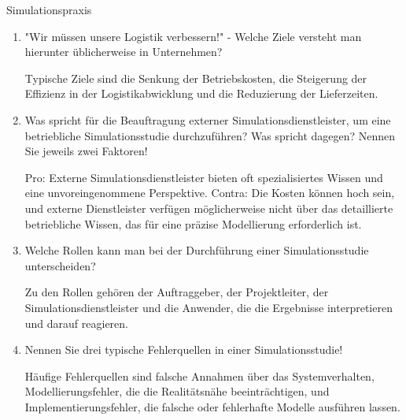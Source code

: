 \documentclass{article}
\begin{document}
\begin{exercise}{Simulationspraxis}
  \begin{enumerate}
    \item "Wir müssen unsere Logistik verbessern!" - Welche Ziele versteht man hierunter üblicherweise in Unternehmen?

          \begin{solution}
            Typische Ziele sind die Senkung der Betriebskosten, die Steigerung der Effizienz in der Logistikabwicklung und die Reduzierung der Lieferzeiten.
          \end{solution}

    \item Was spricht für die Beauftragung externer Simulationsdienstleister, um eine betriebliche Simulationsstudie durchzuführen? Was spricht dagegen? Nennen Sie jeweils zwei Faktoren!

          \begin{solution}
            Pro: Externe Simulationsdienstleister bieten oft spezialisiertes Wissen und eine unvoreingenommene Perspektive. Contra: Die Kosten können hoch sein, und externe Dienstleister verfügen möglicherweise nicht über das detaillierte betriebliche Wissen, das für eine präzise Modellierung erforderlich ist.
          \end{solution}

    \item Welche Rollen kann man bei der Durchführung einer Simulationsstudie unterscheiden?

          \begin{solution}
            Zu den Rollen gehören der Auftraggeber, der Projektleiter, der Simulationsdienstleister und die Anwender, die die Ergebnisse interpretieren und darauf reagieren.
          \end{solution}

    \item Nennen Sie drei typische Fehlerquellen in einer Simulationsstudie!

          \begin{solution}
            Häufige Fehlerquellen sind falsche Annahmen über das Systemverhalten, Modellierungsfehler, die die Realitätsnähe beeinträchtigen, und Implementierungsfehler, die falsche oder fehlerhafte Modelle ausführen lassen.
          \end{solution}
  \end{enumerate}
\end{exercise}
\end{document}
